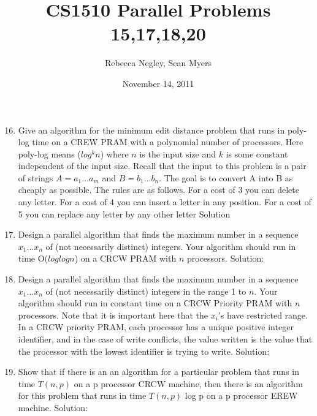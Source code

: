 \documentclass{article}
\title{CS1510  Parallel Problems 15,17,18,20}
\author{Rebecca Negley, Sean Myers}
\date{November 14, 2011}
\begin{document}
\maketitle

\begin{enumerate}
\setcounter{enumi}{15}
\item Give an algorithm for the minimum edit distance problem that runs in poly-log time on a CREW
\newline PRAM with a polynomial number of processors. Here poly-log means ($log^kn$) where $n$ is the 
\newline input size and $k$ is some constant independent of the input size.
\newline Recall that the input to this problem is a pair of strings $A = a_1 ...  a_m$ and $B = b_1 ... b_n$. The goal is
\newline to convert A into B as cheaply as possible. The rules are as follows. For a cost of 3 you can delete any
\newline letter. For a cost of 4 you can insert a letter in any position. For a cost of 5 you can replace any letter
\newline by any other letter
\newline Solution
\newline
\setcounter{enumi}{16}
\item Design a parallel algorithm that finds the maximum number in a sequence $x_1... x_n$ of (not necessarily
\newline distinct) integers. Your algorithm should run in time O($log log n$) on a CRCW PRAM with $n$ processors.
\newline
Solution:
\newline
\item Design a parallel algorithm that finds the maximum number in a sequence $x_1...x_n$ of (not necessarily
\newline distinct) integers in the range 1 to $n$. Your algorithm should run in constant time on a CRCW Priority
\newline PRAM with $n$ processors. Note that it is important here that the $x_i$'s have restricted range. In a
\newline CRCW priority PRAM, each processor has a unique positive integer identifier, and in the case of write
\newline conflicts, the value written is the value that the processor with the lowest identifier is trying to write.
\newline
Solution:
\newline
\setcounter{enumi}{19}
\item Show that if there is an an algorithm for a particular problem that runs in time $T(n, p)$ on a p
\newline processor CRCW machine, then there is an algorithm for this problem that runs in time $T(n, p)$ log p
on a p processor EREW machine.
\newline
Solution:
\end{enumerate}
\end{document}
